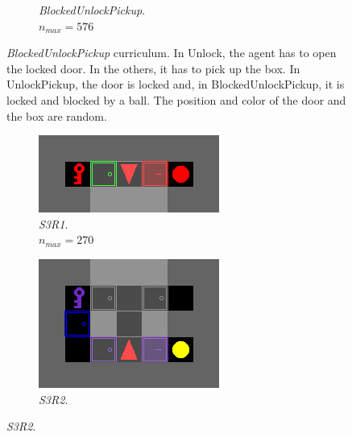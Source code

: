 \documentclass{article}
\begin{document}
\begin{figure}[H]
\begin{subfigure}[b]{0.32\linewidth}
    \caption{\textit{BlockedUnlockPickup}. \\
    \(n_{max}=576\)}
  \end{subfigure}
  \caption{\textit{BlockedUnlockPickup} curriculum. In Unlock, the agent has to open the locked door. In the others, it has to pick up the box. In UnlockPickup, the door is locked and, in BlockedUnlockPickup, it is locked and blocked by a ball. The position and color of the door and the box are random.}
\label{fig:blockedunlockpickup}
\end{figure}

\begin{figure}[H]
  \begin{subfigure}[b]{0.32\linewidth}
    \centering
    \includegraphics[width=\linewidth]{Tasks/KeyCorridor/S3R1}
    \caption{\textit{S3R1}. \\ \(n_{max}=270\)}
  \end{subfigure}
  \hfill
  \begin{subfigure}[b]{0.32\linewidth}
    \centering
    \includegraphics[width=\linewidth]{Tasks/KeyCorridor/S3R2}
    \caption{\textit{S3R2}. \\
}
\end{subfigure}
\end{figure}
\end{document}
